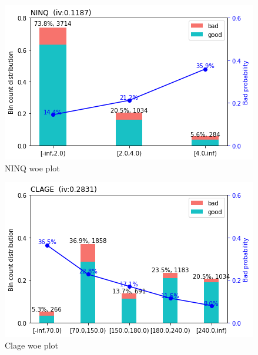 \begin{figure}
\centering
  \centering
  \includegraphics[width=0.9\linewidth]{figs/ninq_woe_plot.png}
  \caption{NINQ woe plot}
  \label{fig:NinqWoe}
\end{figure}

\begin{figure}
  \centering
 \includegraphics[width=0.9\linewidth]{figs/clage_woe_plot.png}
  \caption{Clage woe plot}
  \label{fig:ClageWoe}
\end{figure}

